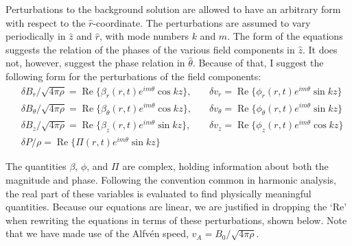 \documentclass[letterpaper]{article}
\begin{document}
Perturbations to the background solution are allowed to have an
arbitrary form with respect to the $\hat{r}$-coordinate.  The
perturbations are assumed to vary periodically in $\hat{z}$ and
$\hat{r}$, with mode numbers $k$ and $m$.  The form of the equations
suggests the relation of the phases of the various field components in
$\hat{z}$.  It does not, however, suggest the phase relation in
$\hat{\theta}$.  Because of that, I suggest the following form for the
perturbations of the field components:
\begin{align*}
&\delta B_r / \sqrt{4\pi\rho} = \operatorname{Re}\{\beta_r (r,t)e^{im\theta}\cos{kz}\},\quad
&\delta v_r = \operatorname{Re}\{\phi_r (r,t) e^{im\theta} \sin{kz}\}
\\
&\delta B_\theta / \sqrt{4\pi\rho} = \operatorname{Re}\{\beta_\theta (r,t)e^{im\theta}\cos{kz}\},\quad
&\delta v_\theta = \operatorname{Re}\{\phi_\theta (r,t) e^{im\theta} \sin{kz}\}
\\
&\delta B_z / \sqrt{4\pi\rho} = \operatorname{Re}\{\beta_z (r,t)e^{im\theta}\sin{kz}\},\quad
&\delta v_z = \operatorname{Re}\{\phi_z (r,t) e^{im\theta} \cos{kz}\}
\\
&\delta P / \rho = \operatorname{Re}\{\Pi (r,t) e^{im\theta} \sin{kz}\}&
\end{align*}

The quantities $\beta$, $\phi$, and $\Pi$ are complex, holding
information about both the magnitude and phase. Following the
convention common in harmonic analysis, the real part of these
variables is evaluated to find physically meaningful
quantities. Because our equations are linear, we are justified in
dropping the `$\mathrm{Re}$' when rewriting the equations in terms of
these perturbations, shown below. Note that we have made use of the
Alfv\'{e}n speed, $v_A = B_0/\sqrt{4\pi\rho}$.
\end{document}
